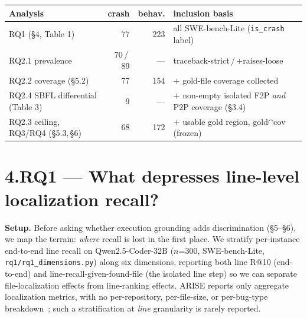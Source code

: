 \documentclass[11pt]{article}
\newcommand{\code}[1]{\texttt{#1}}
\begin{document}
\begin{center}\footnotesize
\begin{tabular}{lrrl}
\toprule
Analysis & crash & behav. & inclusion basis \\
\midrule
RQ1 (\S4, Table 1) & 77 & 223 & all SWE-bench-Lite (\code{is\_crash} label) \\
RQ2.1 prevalence & 70\,/\,89 & --- & traceback-strict\,/\,$+$raises-loose \\
RQ2.2 coverage (\S5.2) & 77 & 154 & $+$ gold-file coverage collected \\
RQ2.4 SBFL differential (Table 3) & 9 & --- & $+$ non-empty isolated F2P \emph{and} P2P coverage (\S3.4) \\
RQ2.3 ceiling, RQ3/RQ4 (\S5.3,\,\S6) & 68 & 172 & $+$ usable gold region, gold$\cap$cov (frozen) \\
\bottomrule
\end{tabular}
\end{center}

\section*{4.\quad RQ1 --- What depresses line-level localization recall?}

\noindent\textbf{Setup.} Before asking whether execution grounding adds discrimination (\S5--\S6), we map the terrain: \emph{where} recall is lost in the first place. We stratify per-instance end-to-end line recall on Qwen2.5-Coder-32B ($n$=300, SWE-bench-Lite, \code{rq1/rq1\_dimensions.py}) along six dimensions, reporting both line R@10 (end-to-end) and line-recall-given-found-file (the isolated line step) so we can separate file-localization effects from line-ranking effects. ARISE reports only aggregate localization metrics, with no per-repository, per-file-size, or per-bug-type breakdown~\citep{arise}; such a stratification at \emph{line} granularity is rarely reported.
\end{document}
